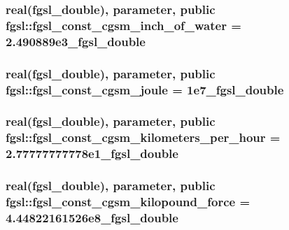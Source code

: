 \hypertarget{classfgsl_ae3e9d91a0883033afa45f2237810a306}{
\subsubsection[{fgsl\-\_\-const\-\_\-cgsm\-\_\-inch\-\_\-of\-\_\-water}]{\setlength{\rightskip}{0pt plus 5cm}real({\bf fgsl\-\_\-double}), parameter, public fgsl\-::fgsl\-\_\-const\-\_\-cgsm\-\_\-inch\-\_\-of\-\_\-water = 2.\-490889e3\-\_\-fgsl\-\_\-double}}\label{classfgsl_ae3e9d91a0883033afa45f2237810a306}
\hypertarget{classfgsl_adea52d494e1c4e17f003736bd07eb592}{
\subsubsection[{fgsl\-\_\-const\-\_\-cgsm\-\_\-joule}]{\setlength{\rightskip}{0pt plus 5cm}real({\bf fgsl\-\_\-double}), parameter, public fgsl\-::fgsl\-\_\-const\-\_\-cgsm\-\_\-joule = 1e7\-\_\-fgsl\-\_\-double}}\label{classfgsl_adea52d494e1c4e17f003736bd07eb592}
\hypertarget{classfgsl_a302d497108c596ed552f90c728af3002}{
\subsubsection[{fgsl\-\_\-const\-\_\-cgsm\-\_\-kilometers\-\_\-per\-\_\-hour}]{\setlength{\rightskip}{0pt plus 5cm}real({\bf fgsl\-\_\-double}), parameter, public fgsl\-::fgsl\-\_\-const\-\_\-cgsm\-\_\-kilometers\-\_\-per\-\_\-hour = 2.\-77777777778e1\-\_\-fgsl\-\_\-double}}\label{classfgsl_a302d497108c596ed552f90c728af3002}
\hypertarget{classfgsl_aca0248b47e63c840ed0ab430927008f1}{
\subsubsection[{fgsl\-\_\-const\-\_\-cgsm\-\_\-kilopound\-\_\-force}]{\setlength{\rightskip}{0pt plus 5cm}real({\bf fgsl\-\_\-double}), parameter, public fgsl\-::fgsl\-\_\-const\-\_\-cgsm\-\_\-kilopound\-\_\-force = 4.\-44822161526e8\-\_\-fgsl\-\_\-double}}\label{classfgsl_aca0248b47e63c840ed0ab430927008f1}
